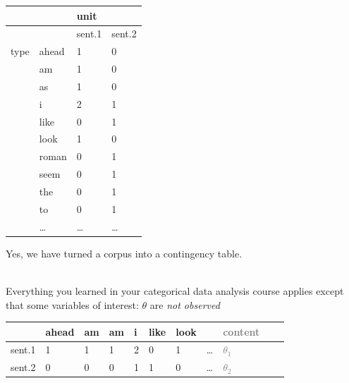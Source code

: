 \documentclass{mediumfoils}
\begin{document}

\begin{center}
\small
\begin{tabular}{rlll}\toprule
          &         & unit    & \\ \midrule
          &         & sent.1 & sent.2 \\ \midrule
type      & ahead   & 1    & 0 \\
          & am      & 1    & 0 \\
          & as      & 1    & 0 \\
          & i       & 2    & 1 \\
          & like    & 0    & 1\\
          & look    & 1    & 0 \\
          & roman   & 0    & 1 \\
          & seem    & 0    & 1 \\          
          & the     & 0    & 1 \\
          & to      & 0    & 1\\
          & \ldots  & \ldots & \ldots \\ \bottomrule
\end{tabular}
\normalsize
\end{center}


Yes, we have turned a corpus into a contingency table.

~\\
Everything you learned in your categorical data analysis course applies
\ita
\itm except that some variables of interest: $\theta$ are \textit{not observed}
\itz



\begin{center}
\small
\begin{tabular}{rllllllllll}\toprule
        & ahead & am & am & i & like & look &  & \textcolor{gray}{content} \\ \midrule
sent.1  & 1     & 1  & 1  & 2 & 0    & 1    & \ldots & \textcolor{gray}{$\theta_1$} \\
sent.2  & 0     & 0  & 0  & 1 & 1    & 0    & \ldots & \textcolor{gray}{$\theta_2$} \\ \bottomrule
\end{tabular} 
\normalsize
\end{center}
~\\\
\end{document}
